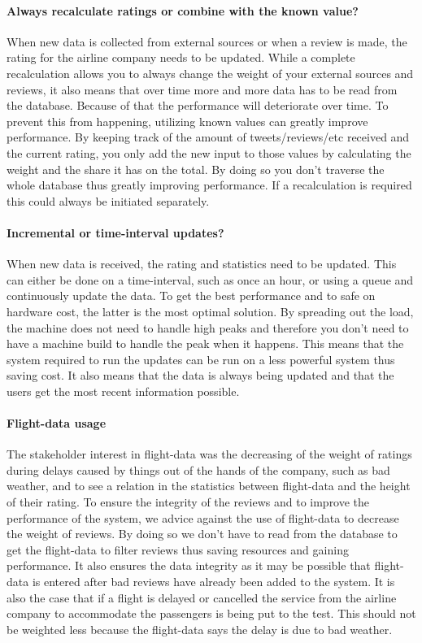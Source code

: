 \documentclass{article}
\begin{document}
\paragraph{Always recalculate ratings or combine with the known value?}
When new data is collected from external sources or when a review is made, the rating for the airline company needs to be updated. While a complete recalculation allows you to always change the weight of your external sources and reviews, it also means that over time more and more data has to be read from the database. Because of that the performance will deteriorate over time.
To prevent this from happening, utilizing known values can greatly improve performance. By keeping track of the amount of tweets/reviews/etc received and the current rating, you only add the new input to those values by calculating the weight and the share it has on the total. By doing so you don't traverse the whole database thus greatly improving performance. If a recalculation is required this could always be initiated separately.

\paragraph{Incremental or time-interval updates?}
When new data is received, the rating and statistics need to be updated. This can either be done on a time-interval, such as once an hour, or using a queue and continuously update the data. To get the best performance and to safe on hardware cost, the latter is the most optimal solution. By spreading out the load, the machine does not need to handle high peaks and therefore you don't need to have a machine build to handle the peak when it happens. This means that the system required to run the updates can be run on a less powerful system thus saving cost. It also means that the data is always being updated and that the users get the most recent information possible.

\paragraph{Flight-data usage}
The stakeholder interest in flight-data was the decreasing of the weight of ratings during delays caused by things out of the hands of the company, such as bad weather, and to see a relation in the statistics between flight-data and the height of their rating. To ensure the integrity of the reviews and to improve the performance of the system, we advice against the use of flight-data to decrease the weight of reviews. By doing so we don't have to read from the database to get the flight-data to filter reviews thus saving resources and gaining performance. It also ensures the data integrity as it may be possible that flight-data is entered after bad reviews have already been added to the system. It is also the case that if a flight is delayed or cancelled the service from the airline company to accommodate the passengers is being put to the test. This should not be weighted less because the flight-data says the delay is due to bad weather.
\end{document}
